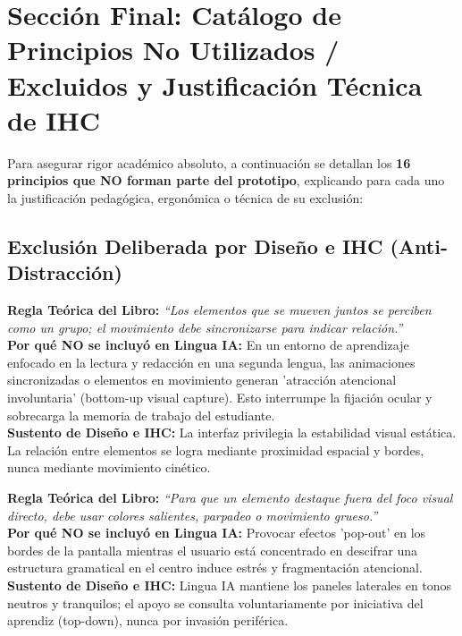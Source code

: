 \documentclass[10pt,a4paper]{article}
\begin{document}
\newpage
\section{Sección Final: Catálogo de Principios No Utilizados / Excluidos y Justificación Técnica de IHC}

Para asegurar rigor académico absoluto, a continuación se detallan los \textbf{16 principios que NO forman parte del prototipo}, explicando para cada uno la justificación pedagógica, ergonómica o técnica de su exclusión:


\subsection*{Exclusión Deliberada por Diseño e IHC (Anti-Distracción)}

\begin{tcolorbox}[excludedbox, title={C2.7 -- Destino común: lo que se mueve junto está relacionado \hfill \colorbox{linguaRed}{\scriptsize\textbf{EXCLUIDO}}}]
\small
\textbf{Regla Teórica del Libro:} \textit{``Los elementos que se mueven juntos se perciben como un grupo; el movimiento debe sincronizarse para indicar relación.''}\\
\textbf{Por qué NO se incluyó en Lingua IA:} En un entorno de aprendizaje enfocado en la lectura y redacción en una segunda lengua, las animaciones sincronizadas o elementos en movimiento generan 'atracción atencional involuntaria' (bottom-up visual capture). Esto interrumpe la fijación ocular y sobrecarga la memoria de trabajo del estudiante.\\
\textbf{Sustento de Diseño e IHC:} La interfaz privilegia la estabilidad visual estática. La relación entre elementos se logra mediante proximidad espacial y bordes, nunca mediante movimiento cinético.
\end{tcolorbox}

\begin{tcolorbox}[excludedbox, title={C5.4 -- Usar señales que 'pop' en la periferia \hfill \colorbox{linguaRed}{\scriptsize\textbf{EXCLUIDO}}}]
\small
\textbf{Regla Teórica del Libro:} \textit{``Para que un elemento destaque fuera del foco visual directo, debe usar colores salientes, parpadeo o movimiento grueso.''}\\
\textbf{Por qué NO se incluyó en Lingua IA:} Provocar efectos 'pop-out' en los bordes de la pantalla mientras el usuario está concentrado en descifrar una estructura gramatical en el centro induce estrés y fragmentación atencional.\\
\textbf{Sustento de Diseño e IHC:} Lingua IA mantiene los paneles laterales en tonos neutros y tranquilos; el apoyo se consulta voluntariamente por iniciativa del aprendiz (top-down), nunca por invasión periférica.
\end{tcolorbox}
\end{document}
